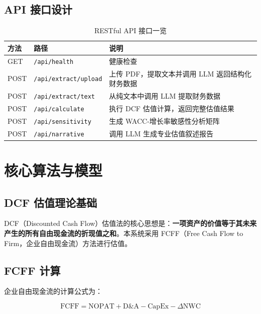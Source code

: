\documentclass[12pt,a4paper]{article}
\begin{document}
\subsection{API 接口设计}

\begin{table}[H]
\centering
\caption{RESTful API 接口一览}
\label{tab:api}
\begin{tabular}{@{}llp{7cm}@{}}
\toprule
\textbf{方法} & \textbf{路径} & \textbf{说明} \\
\midrule
GET  & \texttt{/api/health}          & 健康检查 \\
POST & \texttt{/api/extract/upload}  & 上传 PDF，提取文本并调用 LLM 返回结构化财务数据 \\
POST & \texttt{/api/extract/text}    & 从纯文本中调用 LLM 提取财务数据 \\
POST & \texttt{/api/calculate}       & 执行 DCF 估值计算，返回完整估值结果 \\
POST & \texttt{/api/sensitivity}     & 生成 WACC-增长率敏感性分析矩阵 \\
POST & \texttt{/api/narrative}       & 调用 LLM 生成专业估值叙述报告 \\
\bottomrule
\end{tabular}
\end{table}

\section{核心算法与模型}

\subsection{DCF 估值理论基础}

DCF（Discounted Cash Flow）估值法的核心思想是：\textbf{一项资产的价值等于其未来产生的所有自由现金流的折现值之和}。本系统采用 FCFF（Free Cash Flow to Firm，企业自由现金流）方法进行估值。

\subsection{FCFF 计算}

企业自由现金流的计算公式为：

\begin{equation}
\text{FCFF} = \text{NOPAT} + \text{D\&A} - \text{CapEx} - \Delta\text{NWC}
\label{eq:fcff}
\end{equation}
\end{document}
